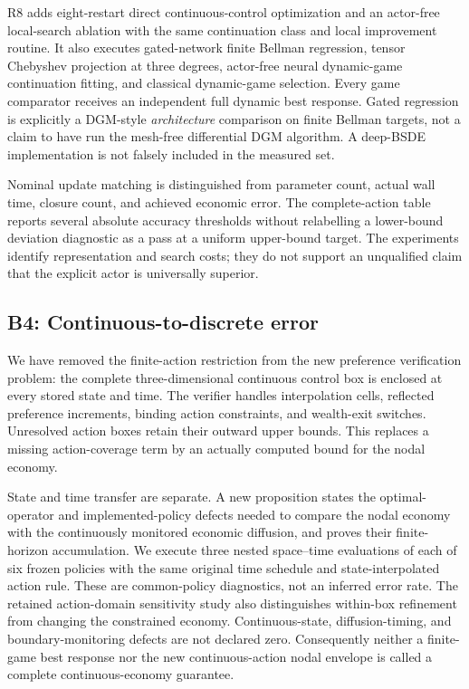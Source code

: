 R8 adds eight-restart direct continuous-control optimization and an actor-free local-search ablation with the same continuation class and local improvement routine. It also executes gated-network finite Bellman regression, tensor Chebyshev projection at three degrees, actor-free neural dynamic-game continuation fitting, and classical dynamic-game selection. Every game comparator receives an independent full dynamic best response. Gated regression is explicitly a DGM-style \emph{architecture} comparison on finite Bellman targets, not a claim to have run the mesh-free differential DGM algorithm. A deep-BSDE implementation is not falsely included in the measured set.

Nominal update matching is distinguished from parameter count, actual wall time, closure count, and achieved economic error. The complete-action table reports several absolute accuracy thresholds without relabelling a lower-bound deviation diagnostic as a pass at a uniform upper-bound target. The experiments identify representation and search costs; they do not support an unqualified claim that the explicit actor is universally superior.

\subsection{B4: Continuous-to-discrete error}
We have removed the finite-action restriction from the new preference verification problem: the complete three-dimensional continuous control box is enclosed at every stored state and time. The verifier handles interpolation cells, reflected preference increments, binding action constraints, and wealth-exit switches. Unresolved action boxes retain their outward upper bounds. This replaces a missing action-coverage term by an actually computed bound for the nodal economy.

State and time transfer are separate. A new proposition states the optimal-operator and implemented-policy defects needed to compare the nodal economy with the continuously monitored economic diffusion, and proves their finite-horizon accumulation. We execute three nested space--time evaluations of each of six frozen policies with the same original time schedule and state-interpolated action rule. These are common-policy diagnostics, not an inferred error rate. The retained action-domain sensitivity study also distinguishes within-box refinement from changing the constrained economy. Continuous-state, diffusion-timing, and boundary-monitoring defects are not declared zero. Consequently neither a finite-game best response nor the new continuous-action nodal envelope is called a complete continuous-economy guarantee.

